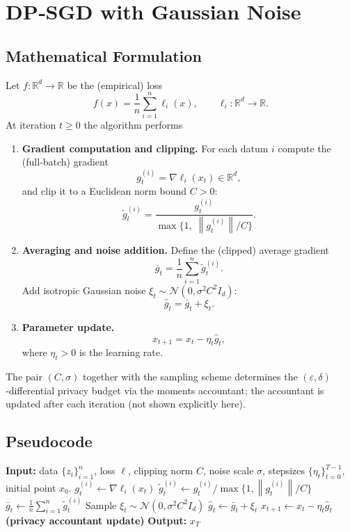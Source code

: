 \documentclass{article}
\newcommand{\R}{\mathbb{R}}
\newcommand{\norm}[1]{\left\lVert #1\right\rVert}
\begin{document}
\section*{DP‑SGD with Gaussian Noise}

\subsection*{Mathematical Formulation}
Let $f:\R^{d}\to\R$ be the (empirical) loss
\[
f(x)=\frac{1}{n}\sum_{i=1}^{n}\ell_i(x),\qquad \ell_i:\R^{d}\to\R .
\]
At iteration $t\ge 0$ the algorithm performs

\begin{enumerate}
\item \textbf{Gradient computation and clipping.}
For each datum $i$ compute the (full‑batch) gradient
\[
g_{t}^{(i)}=\nabla \ell_i(x_t)\in\R^{d},
\]
and clip it to a Euclidean norm bound $C>0$:
\[
\tilde g_{t}^{(i)}=
\frac{g_{t}^{(i)}}{\max\{1,\;\norm{g_{t}^{(i)}}/C\}} .
\]
\item \textbf{Averaging and noise addition.}
Define the (clipped) average gradient
\[
\bar g_t=\frac{1}{n}\sum_{i=1}^{n}\tilde g_{t}^{(i)} .
\]
Add isotropic Gaussian noise $\xi_t\sim\mathcal N(0,\sigma^{2}C^{2}I_{d})$:
\[
\hat g_t=\bar g_t+\xi_t .
\]
\item \textbf{Parameter update.}
\[
x_{t+1}=x_t-\eta_t \hat g_t ,
\]
where $\eta_t>0$ is the learning rate.
\end{enumerate}

The pair $(C,\sigma)$ together with the sampling scheme determines the
$(\varepsilon,\delta)$‑differential privacy budget via the moments accountant;
the accountant is updated after each iteration (not shown explicitly here).

\subsection*{Pseudocode}
\begin{algorithm}[H]
\caption{DP‑SGD with Gaussian Noise}
\begin{algorithmic}[1]
\STATE \textbf{Input:} data $\{z_i\}_{i=1}^{n}$, loss $\ell$, clipping norm $C$, noise scale $\sigma$, stepsizes $\{\eta_t\}_{t=0}^{T-1}$, initial point $x_0$.
        \STATE $g_{t}^{(i)}\gets \nabla\ell_i(x_t)$
        \STATE $\tilde g_{t}^{(i)}\gets g_{t}^{(i)}/\max\{1,\norm{g_{t}^{(i)}}/C\}$ 
    \ENDFOR
    \STATE $\bar g_t \gets \frac{1}{n}\sum_{i=1}^{n}\tilde g_{t}^{(i)}$
    \STATE Sample $\xi_t\sim\mathcal N(0,\sigma^{2}C^{2}I_{d})$
    \STATE $\hat g_t \gets \bar g_t+\xi_t$
    \STATE $x_{t+1}\gets x_t-\eta_t \hat g_t$
    \STATE \textbf{(privacy accountant update)}  %
\ENDFOR
\STATE \textbf{Output:} $x_T$
\end{algorithmic}
\end{algorithm}
\end{document}

